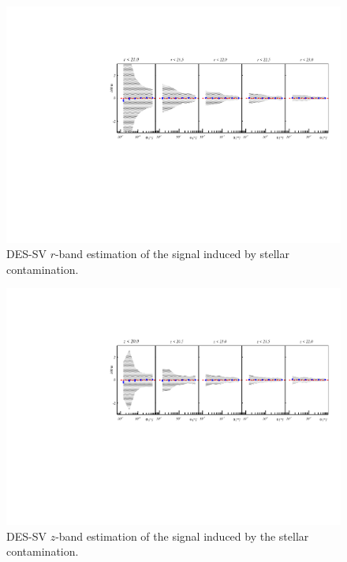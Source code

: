 \begin{figure}
\includegraphics[width=\textwidth,trim={0 2.3cm 0 3.5cm},clip]{./figures_appendix/mag_rstars.pdf}
\caption{DES-SV $r$-band estimation of the signal induced by stellar contamination.}
\end{figure}

\begin{figure}
\includegraphics[width=\textwidth,trim={0 2.3cm 0 3.5cm},clip]{./figures_appendix/mag_zstars.pdf}
\caption{DES-SV $z$-band estimation of the signal induced by the stellar contamination.}
\end{figure}